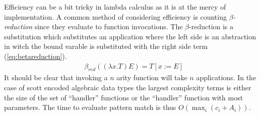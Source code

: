 \documentclass[11pt,oneside,a4paper]{report}
\begin{document}
Efficiency can be a bit tricky in lambda calculus as it is at the mercy of implementation.
A common method of considering efficiency is counting \textit{$\beta$-reduction} since they evaluate to function invocations.
The $\beta$-reduction is a substitution which substitutes an application where the left side is an abstraction in witch the bound varable is substituted with the right side term (\autoref{eq:betareduction}). 
\begin{align}
    &\beta_{red}((\lambda x . T) E) = T[x := E]
   \label{eq:betareduction}
\end{align}
It should be clear that invoking a $n$ arity function will take $n$ applications.
In the case of scott encoded algebraic data types the largest complexity terms is either the size of the set of ``handler'' functions or the ``handler'' function with most parameters.
The time to evaluate pattern match is thus $O(\max_i(c_i + A_i))$.
\end{document}

